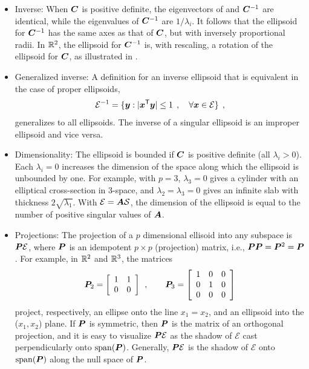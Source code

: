 \begin{itemize}
 \item Inverse: When $\bm{C}$ is positive definite, the eigenvectors of  and $\bm{C}^{-1}$ are identical, while
the
 eigenvalues of $\bm{C}^{-1}$ are $1/\lambda_i$. It follows that the ellipsoid for
 $\bm{C}^{-1}$ has the same axes as that of $\bm{C}$, but with inversely proportional radii.
 In $\mathbb{R}^{2}$, the ellipsoid for $\bm{C}^{-1}$
 is, with rescaling, a  rotation of the ellipsoid for $\bm{C}$,
 as illustrated in .

 \item Generalized inverse: A definition for an inverse ellipsoid that is equivalent in the case of proper ellipsoids,
\begin{equation}\label{eq:ellipseginv}
\mathcal{E}^{-1} = \{ \bm{y} :   |\bm{x} ^\mathsf{T} \bm{y}| \le 1 \:\: , \quad \forall \bm{x} \in \mathcal{E} \} \:\: ,
\end{equation}
generalizes to all ellipsoids. The inverse of a singular ellipsoid is an improper ellipsoid and vice versa.

 \item Dimensionality: The ellipsoid is bounded if $\bm{C}$ is positive definite (all $\lambda_i > 0$).
 Each $\lambda_i = 0$ increases the dimension of the space along which the ellipsoid is unbounded by one.
For example, with $p=3$, $\lambda_3=0$ gives a
cylinder with an elliptical cross-section in 3-space, and  $\lambda_2 = \lambda_3=0$ gives an infinite slab with thickness $2 \sqrt{\lambda_1}$. With $\mathcal{E} = \bm{A} \mathcal{S}$, the dimension of the ellipsoid is equal to the number of positive singular values of $\bm{A}$.
 \item Projections: The projection of a $p$ dimensional ellisoid into any subspace
is $\bm{P} \mathcal{E}$, where
$\bm{P}$ is an idempotent $p \times p$ (projection) matrix, i.e., $\bm{P} \bm{P}= \bm{P}^2 = \bm{P}$.
For example, in $\mathbb{R}^{2}$ and $\mathbb{R}^{3}$,
the matrices
\[
\bm{P}_2 =
\left[
\begin{array}{cc}
 1 & 1  \\
 0 & 0  \\
\end{array}
\right]
\:\: , \quad\quad
\bm{P}_3 =
\left[
\begin{array}{ccc}
 1 & 0 & 0 \\
 0 & 1 & 0 \\
 0 & 0 & 0 \\
\end{array}
\right]
\]
project, respectively, an ellipse onto the line $x_1 = x_2$, and an ellipsoid into the ($x_1, x_2$) plane.  If $\bm{P}$ is symmetric, then $\bm{P}$ is the matrix of an orthogonal projection, and it is easy to visualize  $\bm{P} \mathcal{E}$ as the shadow of  $\mathcal{E}$ cast perpendicularly onto  $\mathrm{span}(\bm{P})$. Generally,  $\bm{P} \mathcal{E}$ is the shadow of $\mathcal{E}$  onto  $\mathrm{span}(\bm{P})$ along the null space of $\bm{P}$.


\end{itemize}
